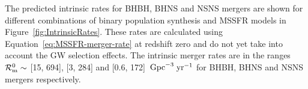 \documentclass[twocolumn]{aastex63}
\newcommand\rate{\mathcal{R}}
\newcommand\bhnsSingle{BHNS\xspace}
\newcommand{\yearmin}{\ensuremath{\,\rm{yr}^{-1}}\xspace}
\newcommand{\GpcminThree}{\ensuremath{\,\rm{Gpc}^{-3}}\xspace}
\begin{document}
%
\begin{table}
\caption{All binary population synthesis models simulated in this study. \\
 $^{*}$total number of \bhnsSingle  mergers found in combined simulation over 30 metallicity bins }
\label{tab:variations-BPS}
\end{table}


The predicted intrinsic rates for BHBH, \bhnsSingle and NSNS mergers are shown for different combinations of binary population synthesis and \ac{MSSFR} models in Figure~\ref{fig:IntrinsicRates}. 
These rates are calculated using Equation~\ref{eq:MSSFR-merger-rate}  at redshift zero and do not yet take into account the \ac{GW} selection effects.  
 The intrinsic merger rates are in the ranges $\rate_{\rm{m}}^0 \sim$ [15, 694], [3, 284] and [0.6,  172] \GpcminThree \yearmin for BHBH, \bhnsSingle and NSNS mergers respectively. 
 
\end{document}

